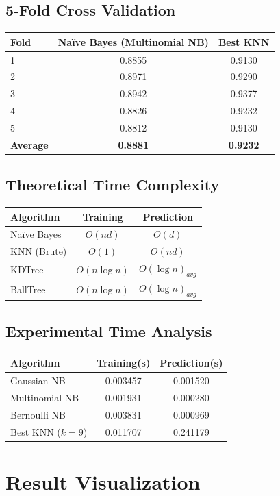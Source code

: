 \documentclass[12pt,a4paper]{article}
\begin{document}
\subsection*{5-Fold Cross Validation}
\begin{tabular}{lcc}
\toprule
Fold & Na\"ive Bayes (Multinomial NB) & Best KNN \\
\midrule
1 & 0.8855 & 0.9130 \\
2 & 0.8971 & 0.9290 \\
3 & 0.8942 & 0.9377 \\
4 & 0.8826 & 0.9232 \\
5 & 0.8812 & 0.9130 \\
\midrule
\textbf{Average} & \textbf{0.8881} & \textbf{0.9232} \\
\bottomrule
\end{tabular}

\subsection*{Theoretical Time Complexity}
\begin{tabular}{lcc}
\toprule
Algorithm & Training & Prediction \\
\midrule
Na\"ive Bayes & $O(nd)$ & $O(d)$ \\
KNN (Brute) & $O(1)$ & $O(nd)$ \\
KDTree & $O(n\log n)$ & $O(\log n)_{avg}$ \\
BallTree & $O(n\log n)$ & $O(\log n)_{avg}$ \\
\bottomrule
\end{tabular}

\subsection*{Experimental Time Analysis}
\begin{tabular}{lcc}
\toprule
Algorithm & Training(s) & Prediction(s) \\
\midrule
Gaussian NB & 0.003457 & 0.001520 \\
Multinomial NB & 0.001931 & 0.000280 \\
Bernoulli NB & 0.003831 & 0.000969 \\
Best KNN ($k=9$) & 0.011707 & 0.241179 \\
\bottomrule
\end{tabular}

\section{Result Visualization}
\end{document}

